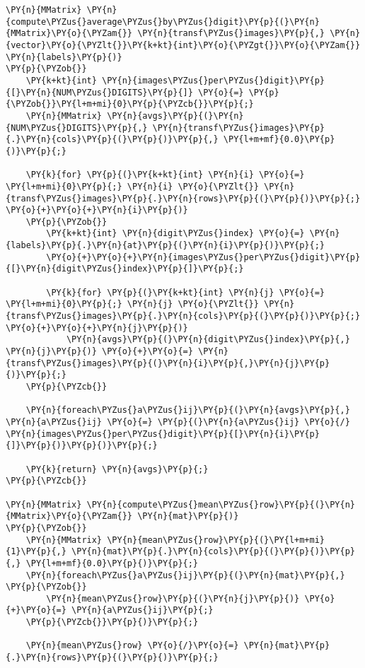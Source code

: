 \begin{Verbatim}[commandchars=\\\{\}]
\PY{n}{MMatrix} \PY{n}{compute\PYZus{}average\PYZus{}by\PYZus{}digit}\PY{p}{(}\PY{n}{MMatrix}\PY{o}{\PYZam{}} \PY{n}{transf\PYZus{}images}\PY{p}{,} \PY{n}{vector}\PY{o}{\PYZlt{}}\PY{k+kt}{int}\PY{o}{\PYZgt{}}\PY{o}{\PYZam{}} \PY{n}{labels}\PY{p}{)}
\PY{p}{\PYZob{}}
	\PY{k+kt}{int} \PY{n}{images\PYZus{}per\PYZus{}digit}\PY{p}{[}\PY{n}{NUM\PYZus{}DIGITS}\PY{p}{]} \PY{o}{=} \PY{p}{\PYZob{}}\PY{l+m+mi}{0}\PY{p}{\PYZcb{}}\PY{p}{;}
	\PY{n}{MMatrix} \PY{n}{avgs}\PY{p}{(}\PY{n}{NUM\PYZus{}DIGITS}\PY{p}{,} \PY{n}{transf\PYZus{}images}\PY{p}{.}\PY{n}{cols}\PY{p}{(}\PY{p}{)}\PY{p}{,} \PY{l+m+mf}{0.0}\PY{p}{)}\PY{p}{;}

	\PY{k}{for} \PY{p}{(}\PY{k+kt}{int} \PY{n}{i} \PY{o}{=} \PY{l+m+mi}{0}\PY{p}{;} \PY{n}{i} \PY{o}{\PYZlt{}} \PY{n}{transf\PYZus{}images}\PY{p}{.}\PY{n}{rows}\PY{p}{(}\PY{p}{)}\PY{p}{;} \PY{o}{+}\PY{o}{+}\PY{n}{i}\PY{p}{)}
	\PY{p}{\PYZob{}}
		\PY{k+kt}{int} \PY{n}{digit\PYZus{}index} \PY{o}{=} \PY{n}{labels}\PY{p}{.}\PY{n}{at}\PY{p}{(}\PY{n}{i}\PY{p}{)}\PY{p}{;}
		\PY{o}{+}\PY{o}{+}\PY{n}{images\PYZus{}per\PYZus{}digit}\PY{p}{[}\PY{n}{digit\PYZus{}index}\PY{p}{]}\PY{p}{;}

		\PY{k}{for} \PY{p}{(}\PY{k+kt}{int} \PY{n}{j} \PY{o}{=} \PY{l+m+mi}{0}\PY{p}{;} \PY{n}{j} \PY{o}{\PYZlt{}} \PY{n}{transf\PYZus{}images}\PY{p}{.}\PY{n}{cols}\PY{p}{(}\PY{p}{)}\PY{p}{;} \PY{o}{+}\PY{o}{+}\PY{n}{j}\PY{p}{)}
			\PY{n}{avgs}\PY{p}{(}\PY{n}{digit\PYZus{}index}\PY{p}{,} \PY{n}{j}\PY{p}{)} \PY{o}{+}\PY{o}{=} \PY{n}{transf\PYZus{}images}\PY{p}{(}\PY{n}{i}\PY{p}{,}\PY{n}{j}\PY{p}{)}\PY{p}{;}
	\PY{p}{\PYZcb{}}

	\PY{n}{foreach\PYZus{}a\PYZus{}ij}\PY{p}{(}\PY{n}{avgs}\PY{p}{,} \PY{n}{a\PYZus{}ij} \PY{o}{=} \PY{p}{(}\PY{n}{a\PYZus{}ij} \PY{o}{/} \PY{n}{images\PYZus{}per\PYZus{}digit}\PY{p}{[}\PY{n}{i}\PY{p}{]}\PY{p}{)}\PY{p}{)}\PY{p}{;}

	\PY{k}{return} \PY{n}{avgs}\PY{p}{;}
\PY{p}{\PYZcb{}}

\PY{n}{MMatrix} \PY{n}{compute\PYZus{}mean\PYZus{}row}\PY{p}{(}\PY{n}{MMatrix}\PY{o}{\PYZam{}} \PY{n}{mat}\PY{p}{)}
\PY{p}{\PYZob{}}
	\PY{n}{MMatrix} \PY{n}{mean\PYZus{}row}\PY{p}{(}\PY{l+m+mi}{1}\PY{p}{,} \PY{n}{mat}\PY{p}{.}\PY{n}{cols}\PY{p}{(}\PY{p}{)}\PY{p}{,} \PY{l+m+mf}{0.0}\PY{p}{)}\PY{p}{;}
	\PY{n}{foreach\PYZus{}a\PYZus{}ij}\PY{p}{(}\PY{n}{mat}\PY{p}{,} \PY{p}{\PYZob{}}
		\PY{n}{mean\PYZus{}row}\PY{p}{(}\PY{n}{j}\PY{p}{)} \PY{o}{+}\PY{o}{=} \PY{n}{a\PYZus{}ij}\PY{p}{;}
	\PY{p}{\PYZcb{}}\PY{p}{)}\PY{p}{;}

	\PY{n}{mean\PYZus{}row} \PY{o}{/}\PY{o}{=} \PY{n}{mat}\PY{p}{.}\PY{n}{rows}\PY{p}{(}\PY{p}{)}\PY{p}{;}


\end{Verbatim}
